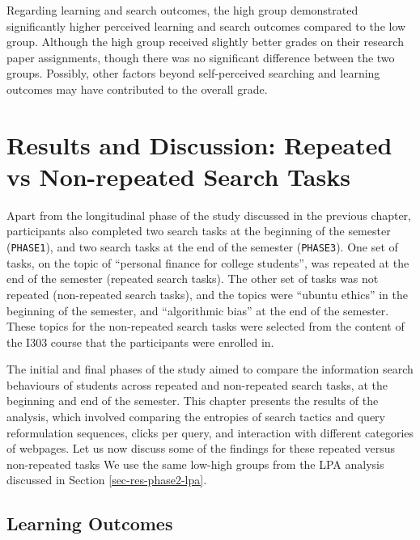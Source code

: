 \documentclass[letterpaper, nobind]{templates/ociamthesis}
\begin{document}
Regarding learning and search outcomes, the high group demonstrated significantly higher perceived learning and search outcomes compared to the low group.
Although the high group received slightly better grades on their research paper assignments, though there was no significant difference between the two groups.
Possibly, other factors beyond self-perceived searching and learning outcomes may have contributed to the overall grade.

\hypertarget{results-and-discussion-repeated-vs-non-repeated-search-tasks}{%
\chapter{Results and Discussion: Repeated vs Non-repeated Search Tasks}\label{results-and-discussion-repeated-vs-non-repeated-search-tasks}}

Apart from the longitudinal phase of the study discussed in the previous chapter, participants also completed two search tasks at the beginning of the semester (\texttt{PHASE1}), and two search tasks at the end of the semester (\texttt{PHASE3}).
One set of tasks, on the topic of ``personal finance for college students'', was repeated at the end of the semester (repeated search tasks).
The other set of tasks was not repeated (non-repeated search tasks), and the topics were ``ubuntu ethics'' in the beginning of the semester, and ``algorithmic bias'' at the end of the semester.
These topics for the non-repeated search tasks were selected from the content of the I303 course that the participants were enrolled in.

The initial and final phases of the study aimed to compare the information search behaviours of students across repeated and non-repeated search tasks, at the beginning and end of the semester.
This chapter presents the results of the analysis, which involved comparing the entropies of search tactics and query reformulation sequences, clicks per query, and interaction with different categories of webpages.
Let us now discuss some of the findings for these repeated versus non-repeated tasks
We use the same low-high groups from the LPA analysis discussed in Section \ref{sec-res-phase2-lpa}.

\hypertarget{learning-outcomes}{%
\section{Learning Outcomes}\label{learning-outcomes}}
\end{document}
